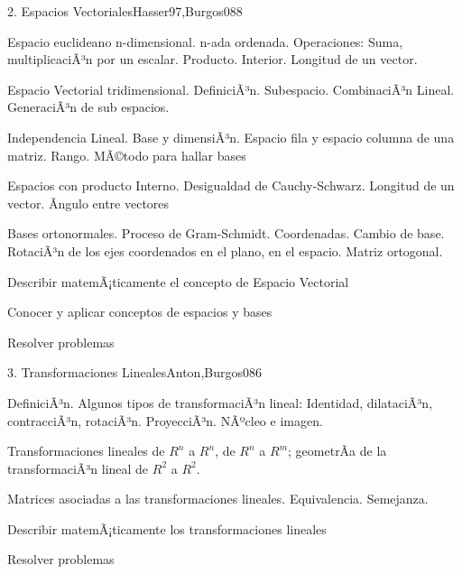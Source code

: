 \begin{syllabus}
\begin{unit}{2. Espacios Vectoriales}{Hasser97,Burgos08}{8}
\begin{topics}
	\item Espacio euclideano n-dimensional. n-ada ordenada. Operaciones: Suma, multiplicaciÃ³n por un escalar. Producto. Interior. Longitud de un vector.
	\item Espacio Vectorial tridimensional. DefiniciÃ³n. Subespacio. CombinaciÃ³n Lineal. GeneraciÃ³n de sub espacios.
      \item Independencia Lineal. Base y dimensiÃ³n. Espacio fila y espacio columna de una matriz. Rango. MÃ©todo para hallar bases
      \item Espacios con producto Interno. Desigualdad de Cauchy-Schwarz. Longitud de un vector. Ãngulo entre vectores
      \item Bases ortonormales. Proceso de Gram-Schmidt. Coordenadas. Cambio de base. RotaciÃ³n de los ejes coordenados en el plano, en el espacio. Matriz ortogonal.
    \end{topics}
   \begin{unitgoals}
      \item Describir matemÃ¡ticamente el concepto de Espacio Vectorial
      \item Conocer y aplicar conceptos de espacios y bases
	\item Resolver problemas
   \end{unitgoals}
\end{unit}

\begin{unit}{3. Transformaciones Lineales}{Anton,Burgos08}{6}
\begin{topics}
      \item DefiniciÃ³n. Algunos tipos de transformaciÃ³n lineal: Identidad, dilataciÃ³n, contracciÃ³n, rotaciÃ³n. ProyecciÃ³n. NÃºcleo e imagen.
      \item Transformaciones lineales de $R^n$ a $R^n$, de $R^n$ a $R^m$; geometrÃ­a de la transformaciÃ³n lineal de $R^2$ a $R^2$.
      \item Matrices asociadas a las transformaciones lineales. Equivalencia. Semejanza.
\end{topics}

   \begin{unitgoals}
      \item Describir matemÃ¡ticamente los transformaciones lineales
	\item Resolver problemas
   \end{unitgoals}
\end{unit}


\end{syllabus}
